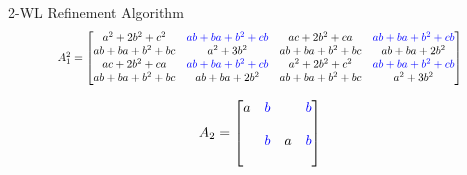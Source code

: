 \documentclass{beamer}
\begin{document}
\begin{frame}{2-WL Refinement Algorithm}
    \vspace{1em}
    \[
    \scalebox{0.8}{
    $
        A_1^2 = \begin{bmatrix}
            {a^2+2b^2+c^2} & \textcolor{blue}{ab+ba+b^2+cb}&ac+2b^2+ca & \textcolor{blue}{ab+ba+b^2+cb}\\
            ab+ba+b^2+bc&a^2+3b^2 & ab+ba+b^2+bc & ab+ba+2b^2\\
            ac+2b^2+ca&\textcolor{blue}{ab+ba+b^2+cb}&a^2+2b^2+c^2&\textcolor{blue}{ab+ba+b^2+cb}\\
            ab+ba+b^2+bc&ab+ba+2b^2&ab+ba+b^2+bc&a^2+3b^2
        \end{bmatrix}
    $
    }
    \]

    \vspace{1em}
    \begin{align*}
        A_2 = \begin{bmatrix}
            a&\textcolor{blue}{b}& &\textcolor{blue}{b}\\
             && &\\
             &\textcolor{blue}{b} &a&\textcolor{blue}{b} \\
             & & & \\
        \end{bmatrix}
    \end{align*}
\end{frame}
\addtocounter{framenumber}{-1}
\end{document}
